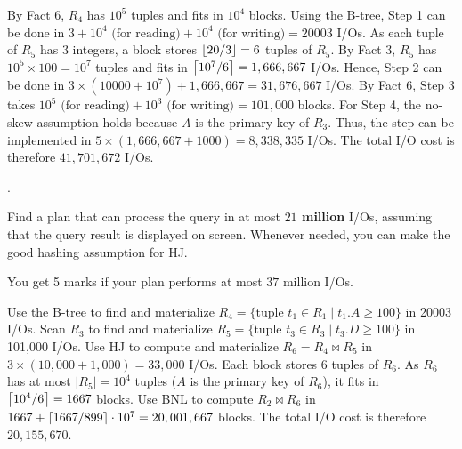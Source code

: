 \begin{sol}
     By Fact 6, $R_4$ has $10^5$ tuples and fits in $10^4$ blocks. Using the B-tree, Step 1 can be done in $3 + 10^4 \text{ (for reading)} + 10^4 \text{ (for writing)} = 20003$ I/Os. As each tuple of $R_5$ has 3 integers, a block stores $\left \lfloor 20/3 \right \rfloor = 6$ tuples of $R_5$. By Fact 3, $R_5$ has $10^5 \times 100 = 10^7$ tuples and fits in $\left \lceil 10^7 / 6 \right \rceil = 1,666,667$ I/Os. Hence, Step 2 can be done in $3 \times (10000 + 10^7) + 1,666,667 = 31,676,667$ I/Os. By Fact 6, Step 3 takes $10^5 \text{ (for reading)} + 10^3 \text{ (for writing)} = 101,000$ blocks. For Step 4, the no-skew assumption holds because $A$ is the primary key of $R_3$. Thus, the step can be implemented in $5 \times (1,666,667 + 1000) = 8,338,335$ I/Os. The total I/O cost is therefore $41,701,672$ I/Os.
\end{sol}


\pagebreak
.

\vspace{100mm}

 Find a plan that can process the query in at most {\bf $21$ million} I/Os, assuming that the query result is displayed on screen. Whenever needed, you can make the good hashing assumption for HJ.

\vgap

You get 5 marks if your plan performs at most $37$ million I/Os.

\begin{sol}
     Use the B-tree to find and materialize $R_4 = \{\text{tuple } t_1 \in R_1 \mid t_1.A \ge 100\}$ in 20003 I/Os. Scan $R_3$ to find and materialize $R_5 = \{\text{tuple } t_3 \in R_3 \mid t_3.D \ge 100\}$ in 101,000 I/Os. Use HJ to compute and materialize $R_6 = R_4 \bowtie R_5$ in $3 \times (10,000 + 1,000) = 33,000$ I/Os. Each block stores 6 tuples of $R_6$. As $R_6$ has at most $|R_5| = 10^4$ tuples ($A$ is the primary key of $R_6$), it fits in $\left \lceil 10^4 / 6 \right \rceil = 1667$ blocks. Use BNL to compute $R_2 \bowtie R_6$ in $1667 + \left \lceil 1667 / 899 \right \rceil \cdot 10^7 = 20,001,667$ blocks. The total I/O cost is therefore $20,155,670$.
\end{sol}


